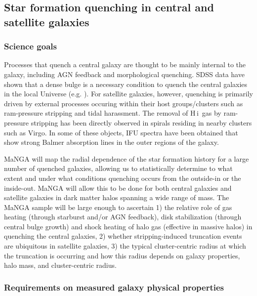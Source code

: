 \documentclass[preprint,11pt]{aastex}
\newcommand{\HI}{{\sc H\,i}}
\begin{document}
\subsection{Star formation quenching in central and satellite galaxies}
\label{sec:high-density}

\subsubsection{Science goals}

Processes that quench a central galaxy are thought to be mainly
internal to the galaxy, including AGN feedback and morphological
quenching.  SDSS data have shown that a dense bulge is a necessary
condition to quench the central galaxies in the local Universe
(e.g. \citealt{fang2013}).  For satellite galaxies, however, quenching
is primarily driven by external processes occuring within their host
groups/clusters such as ram-pressure stripping and tidal
harassment. The removal of \HI\ gas by ram-pressure stripping has been
directly observed in spirals residing in nearby clusters such as
Virgo. In some of these objects, IFU spectra have been obtained that
show strong Balmer absorption lines in the outer regions of the
galaxy.

MaNGA will map the radial dependence of the star formation history for
a large number of quenched galaxies, allowing us to statistically
determine to what extent and under what conditions quenching occurs
from the outside-in or the inside-out. MaNGA will allow this to be
done for both central galaxies and satellite galaxies in dark matter
halos spanning a wide range of mass. The MaNGA sample will be large
enough to ascertain 1) the relative role of gas heating (through
starburst and/or AGN feedback), disk stabilization (through central
bulge growth) and shock heating of halo gas (effective in massive
halos) in quenching the central galaxies, 2) whether stripping-induced
truncation events are ubiquitous in satellite galaxies, 3) the typical
cluster-centric radius at which the truncation is occurring and how
this radius depends on galaxy properties, halo mass, and
cluster-centric radius.

\subsubsection{Requirements on measured galaxy physical properties}
\end{document}
